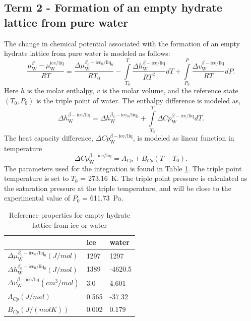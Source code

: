 \documentclass[english]{../thermomemo/thermomemo}
\newcommand{\liq}{\text{liq}}
\newcommand{\wat}{\text{W}}
\newcommand{\ice}{\text{ice}}
\newcommand{\free}{{\ice/\liq}}
\begin{document}
\subsection{Term 2 - Formation of an empty hydrate
  lattice from pure water}
The change in chemical potential associated with the formation of an
empty hydrate lattice from pure water is modeled as follows:
\begin{equation}
  \label{eq:emptylattics}
  \frac{\mu_\wat^\beta - \mu_\wat^\free}{R T} = \frac{\Delta
    \mu_\wat^{\beta_0 - \ice_0/\liq_0}}{R T_0} -
  \overset{T}{\underset{T_0}{\int}} \frac{\Delta
    h_\wat^{\beta - \free}}{R T^2} dT + \overset{P}{\underset{P_0}{\int}} \frac{\Delta
    v_\wat^{\beta - \free}}{R T} dP.
\end{equation}
Here $h$ is the molar enthalpy, $v$ is the molar volume, and the
reference state $\left( T_0, P_0\right)$ is the triple point of
water. The enthalpy difference is modeled as,
\begin{equation}
  \label{eq:latticeformation}
    \Delta h_\wat^{\beta - \free} = \Delta h_\wat^{\beta_0 -
      \ice_0/\liq_0} + \overset{T}{\underset{T_0}{\int}} \Delta
    Cp_\wat^{\beta - \free} dT.
\end{equation}
The heat capacity difference, $\Delta Cp_\wat^{\beta - \free}$, is
modeled as linear function in temperature \cite{Holder1980}
\begin{equation}
  \label{eq:heatcap}
    \Delta Cp_\wat^{\beta - \free} = A_{Cp} + B_{Cp}\left( T - T_0\right).
\end{equation}
The parameters used for the integration is found in Table
\ref{tab:empty_lattice}. The triple point temperature is set to $T_0$
= \SI{273.16}{\kelvin}. The triple point pressure is calculated as the
saturation pressure at the triple temperature, and will be close to
the experimental value of $P_0$ = \SI{611.73}{\pascal}.
\begin{table}[tbp]
  \centering
  \caption{Reference properties for empty hydrate lattice from ice or
    water \cite{Haghighi2009} }
  \begin{tabular}{lll}
    \toprule
     & ice & water \\
    \midrule
    $\Delta \mu_\wat^{\beta_0 - \ice_0/\liq_0} (\unit{J/mol})$ & 1297
    & 1297 \\
    $\Delta h_\wat^{\beta_0 - \ice_0/\liq_0} (\unit{J/mol})$ & 1389 & -4620.5 \\
    $\Delta v_\wat^{\beta - \free} (\unit{cm^3/mol})$ & 3.0  &
  4.601\\
    $A_{Cp} (\unit{J/mol})$ & 0.565 & -37.32 \\
    $B_{Cp} (\unit{J/(mol K)})$ & 0.002 & 0.179\\
    \bottomrule
  \end{tabular}
  \label{tab:empty_lattice}
\end{table}
\end{document}
